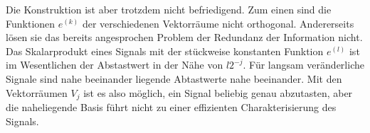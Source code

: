 Die Konstruktion ist aber trotzdem nicht befriedigend.
Zum einen sind die Funktionen $e^{(k)}$ der verschiedenen Vektorräume
nicht orthogonal.
Andererseits lösen sie das bereits angesprochen Problem der Redundanz
der Information nicht.
Das Skalarprodukt eines Signals mit der stückweise konstanten Funktion
$e^{(l)}$ ist im Wesentlichen der Abstastwert in der Nähe von $l2^{-j}$.
Für langsam veränderliche Signale sind nahe beeinander liegende 
Abtastwerte nahe beeinander.
Mit den Vektorräumen $V_j$ ist es also möglich, ein Signal beliebig
genau abzutasten, aber die naheliegende Basis führt nicht zu einer
effizienten Charakterisierung des Signals.

